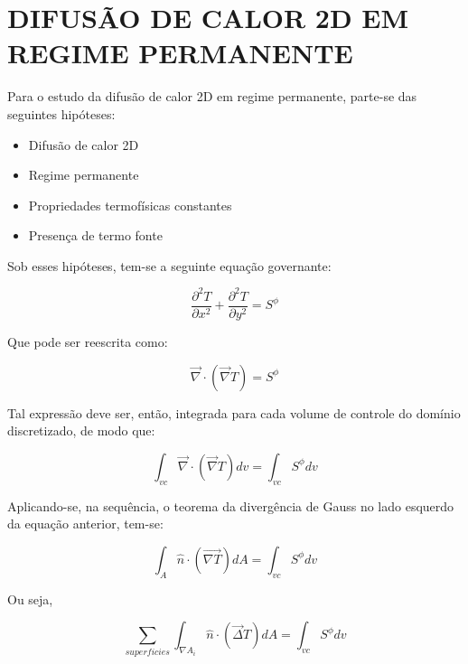 \chapter[DIFUSÃO DE CALOR 2D EM REGIME PERMANENTE]{DIFUSÃO DE CALOR 2D EM REGIME PERMANENTE}

\label{dif2d}

Para o estudo da difusão de calor 2D em regime permanente, parte-se das seguintes hipóteses:
\begin{itemize}
    \item Difusão de calor 2D
    \item Regime permanente
    \item Propriedades termofísicas constantes
    \item Presença de termo fonte
\end{itemize}

Sob esses hipóteses, tem-se a seguinte equação governante:

\begin{equation}
    \label{eq:8.1}
    \frac{\partial^2 T}{\partial x^2} + \frac{\partial^2 T}{\partial y^2} = S^\phi
\end{equation}

Que pode ser reescrita como:

\begin{equation}
    \label{eq:8.2}
    \vec{\nabla} \cdot (\vec{\nabla} T) = S^\phi
\end{equation}

Tal expressão deve ser, então, integrada para cada volume de controle do domínio discretizado, de modo que:

\begin{equation}
    \label{eq:8.3}
    \int_{vc} \vec{\nabla} \cdot (\vec{\nabla}T) dv = \int_{vc}S^\phi dv
\end{equation}

Aplicando-se, na sequência, o teorema da divergência de Gauss no lado esquerdo da equação anterior, tem-se:

\begin{equation}
    \label{eq:8.4}
    \int_A \hat{n} \cdot (\vec{\nabla T}) dA = \int_{vc} S^\phi dv
\end{equation}

Ou seja,

\begin{equation}
    \label{eq:8.5}
    \sum_{superficies} \int_{\nabla A_i} \hat{n} \cdot (\vec{\Delta}T)dA = \int_{vc} S^\phi dv
\end{equation}

